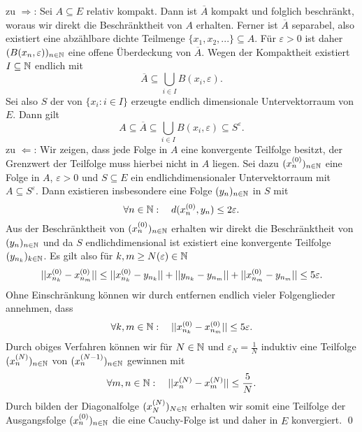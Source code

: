 \begin{proof*}
    zu $\Rightarrow$: Sei $A \subseteq E$ relativ kompakt. Dann ist $\overline{A}$ kompakt und folglich beschränkt, woraus wir direkt die Beschränktheit von $A$ erhalten. 
    Ferner ist $\overline{A}$ separabel, also existiert eine abzählbare dichte Teilmenge $\{x_1, x_2,...\} \subseteq A$. 
    Für $\varepsilon > 0$ ist daher $(B(x_n, \varepsilon))_{n \in \mathbb{N}}$ eine offene Überdeckung von $\overline{A}$. Wegen der Kompaktheit existiert $I \subseteq \mathbb{N}$ endlich mit 
    $$
        \overline{A} \subseteq \bigcup_{i \in I}B(x_i, \varepsilon).
    $$
    Sei also $S$ der von $\{x_i : i \in I\}$ erzeugte endlich dimensionale Untervektorraum von $E$. Dann gilt 
    $$
        A \subseteq \overline{A} \subseteq \bigcup_{i \in I}B(x_i, \varepsilon) \subseteq S^{\varepsilon}.
    $$
    zu $\Leftarrow$: Wir zeigen, dass jede Folge in $A$ eine konvergente Teilfolge besitzt, der Grenzwert der Teilfolge muss hierbei nicht in $A$ liegen. 
    Sei dazu $(x^{(0)}_n)_{n \in \mathbb{N}}$ eine Folge in $A$, $\varepsilon > 0$ und $S \subseteq E$ ein endlichdimensionaler Untervektorraum mit $A \subseteq S^{\varepsilon}$. 
    Dann existieren insbesondere eine Folge $(y_n)_{n \in \mathbb{N}}$ in $S$ mit 
    $$
        \forall n \in \mathbb{N}: \quad d(x^{(0)}_n, y_n) \leq 2\varepsilon.
    $$
    Aus der Beschränktheit von $(x^{(0)}_n)_{n \in \mathbb{N}}$ erhalten wir direkt die Beschränktheit von $(y_n)_{n \in \mathbb{N}}$ und da $S$ endlichdimensional ist existiert eine konvergente Teilfolge $(y_{n_k})_{k \in \mathbb{N}}$.
    Es gilt also für $k,m \geq N(\varepsilon) \in \mathbb{N}$
    \begin{align*}
        \lvert\lvert x^{(0)}_{n_k} - x^{(0)}_{n_m} \rvert\rvert \leq \lvert\lvert x^{(0)}_{n_k} - y_{n_k} \rvert\rvert + \lvert\lvert y_{n_k} - y_{n_m} \rvert\rvert + \lvert\lvert x^{(0)}_{n_m} - y_{n_m} \rvert\rvert \leq 5\varepsilon. 
    \end{align*}
    Ohne Einschränkung können wir durch entfernen endlich vieler Folgenglieder annehmen, dass 
    $$
        \forall k,m \in \mathbb{N}: \quad \lvert\lvert x^{(0)}_{n_k} - x^{(0)}_{n_m} \rvert\rvert \leq 5\varepsilon. 
    $$
    Durch obiges Verfahren können wir für $N \in \mathbb{N}$ und $\varepsilon_N = \frac{1}{N}$ induktiv eine Teilfolge $(x^{(N)}_n)_{n \in \mathbb{N}}$ von $(x^{(N-1)}_n)_{n \in \mathbb{N}}$ gewinnen mit
    $$
        \forall m,n \in \mathbb{N}: \quad \lvert\lvert x^{(N)}_n - x^{(N)}_m \rvert\rvert \leq \frac{5}{N}.
    $$
    Durch bilden der Diagonalfolge $(x^{(N)}_N)_{N \in \mathbb{N}}$ erhalten wir somit eine Teilfolge der Ausgangsfolge $(x^{(0)}_n)_{n \in \mathbb{N}}$ die eine Cauchy-Folge ist und daher in $E$ konvergiert. 
    \qed 
\end{proof*}

